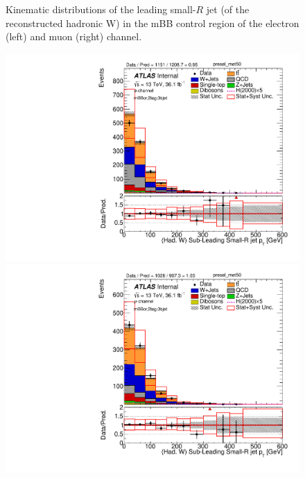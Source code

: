 \begin{figure}[!ht]
\begin{center}
\caption{Kinematic distributions of the leading small-$R$ jet (of the reconstructed hadronic W) in the mBB control region of the electron (left) 
and muon (right) channel.}
\label{fig:boosted_mbbcrleptons_whad_leadjet}
\end{center}
\end{figure}


\begin{figure}[!ht]
\begin{center}
\includegraphics[scale=0.33]{./figures/boosted/PlotByChannels/DataMC_2tag_0bjet_mbbcr_elec_presel_met50_LightJet2Pt}
\includegraphics[scale=0.33]{./figures/boosted/PlotByChannels/DataMC_2tag_0bjet_mbbcr_muon_presel_met50_LightJet2Pt}

\end{center}
\end{figure}
